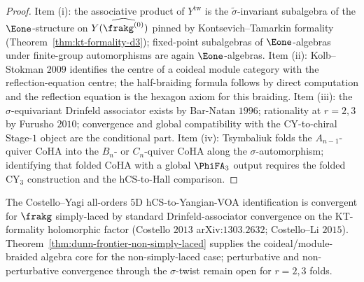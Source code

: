 \begin{proof}
Item (i): the associative product of $Y^{\mathrm{tw}}$ is the $\widetilde\sigma$-invariant subalgebra of the $\Eone$-structure on $Y(\widehat{\frakg^{(0)}})$ pinned by Kontsevich--Tamarkin formality (Theorem~\ref{thm:kt-formality-d3}); fixed-point subalgebras of $\Eone$-algebras under finite-group automorphisms are again $\Eone$-algebras. Item (ii): Kolb--Stokman $2009$ identifies the centre of a coideal module category with the reflection-equation centre; the half-braiding formula follows by direct computation and the reflection equation is the hexagon axiom for this braiding. Item (iii): the $\sigma$-equivariant Drinfeld associator exists by Bar-Natan $1996$; rationality at $r = 2, 3$ by Furusho $2010$; convergence and global compatibility with the CY-to-chiral Stage-$1$ object are the conditional part. Item (iv): Tsymbaliuk folds the $A_{n-1}$-quiver CoHA into the $B_n$- or $C_n$-quiver CoHA along the $\sigma$-automorphism; identifying that folded CoHA with a global $\PhiFA_3$ output requires the folded CY$_3$ construction and the hCS-to-Hall comparison.
\end{proof}

\begin{remark}
\label{rem:simply-laced-vs-non-simply-laced}
The Costello--Yagi all-orders $5$D hCS-to-Yangian-VOA identification is convergent for $\frakg$ simply-laced by standard Drinfeld-associator convergence on the KT-formality holomorphic factor (Costello $2013$ arXiv:$1303.2632$; Costello--Li $2015$). Theorem~\ref{thm:dunn-frontier-non-simply-laced} supplies the coideal/module-braided algebra core for the non-simply-laced case; perturbative and non-perturbative convergence through the $\sigma$-twist remain open for $r = 2, 3$ folds.
\end{remark}

